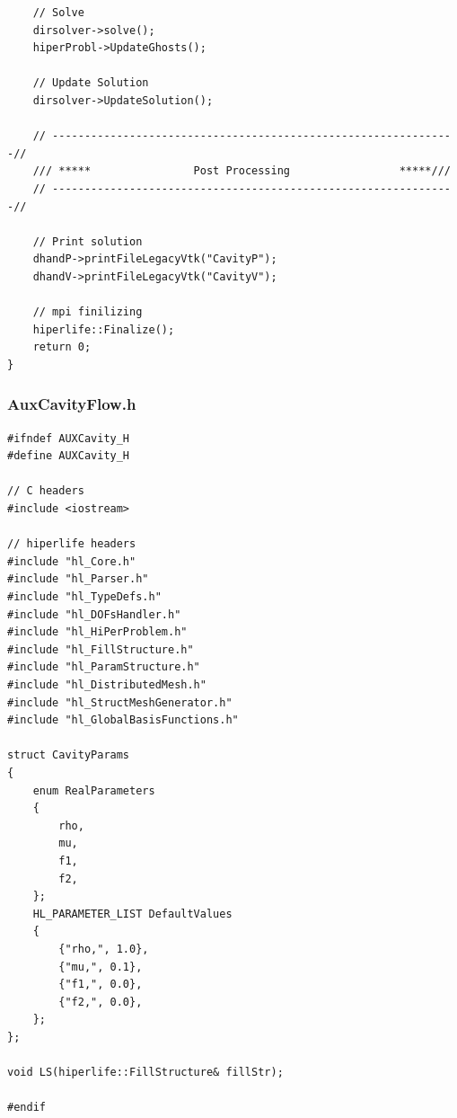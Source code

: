 \documentclass[]{article}
\begin{document}
\begin{lstlisting}
	// Solve
	dirsolver->solve();
	hiperProbl->UpdateGhosts();
		
	// Update Solution
	dirsolver->UpdateSolution();
	
	// ---------------------------------------------------------------//
	/// *****                Post Processing                 *****///
	// ---------------------------------------------------------------//
	
	// Print solution
	dhandP->printFileLegacyVtk("CavityP");
	dhandV->printFileLegacyVtk("CavityV");
	
	// mpi finilizing
	hiperlife::Finalize();
	return 0;
}
\end{lstlisting}
\subsubsection{AuxCavityFlow.h} \label{sec: a.h}
\begin{lstlisting}
#ifndef AUXCavity_H
#define AUXCavity_H

// C headers
#include <iostream>

// hiperlife headers
#include "hl_Core.h"
#include "hl_Parser.h"
#include "hl_TypeDefs.h"  
#include "hl_DOFsHandler.h"
#include "hl_HiPerProblem.h"
#include "hl_FillStructure.h"
#include "hl_ParamStructure.h"
#include "hl_DistributedMesh.h" 
#include "hl_StructMeshGenerator.h" 
#include "hl_GlobalBasisFunctions.h"

struct CavityParams
{
	enum RealParameters
	{
		rho,
		mu,
		f1,
		f2,
	};
	HL_PARAMETER_LIST DefaultValues
	{
		{"rho,", 1.0},
		{"mu,", 0.1},
		{"f1,", 0.0},
		{"f2,", 0.0},
	};
};

void LS(hiperlife::FillStructure& fillStr);

#endif

\end{lstlisting}
\end{document}
